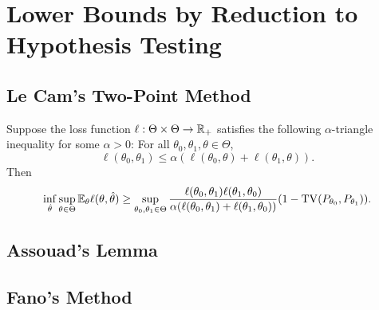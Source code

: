 \section{Lower Bounds by Reduction to Hypothesis Testing}
\subsection{Le Cam's Two-Point Method}
\begin{theorem}
    Suppose the loss function $\ell:\Theta\times\Theta\to\mathbb{R}_{+}$ satisfies the following $\alpha$-triangle inequality for some $\alpha>0$: For all $\theta_0,\theta_1,\theta\in\Theta$,
    \[\ell(\theta_0,\theta_1)\leq \alpha(\ell(\theta_0,\theta)+\ell(\theta_1,\theta)).\]
    Then 
    \begin{equation*}
        \inf_{\hat\theta}\sup_{\theta\in\Theta}\mathbb{E}_\theta\ell(\theta,\hat\theta)\geq \sup_{\theta_0,\theta_1\in\Theta}\frac{\ell(\theta_0,\theta_1)\ell(\theta_1,\theta_0)}{\alpha(\ell(\theta_0,\theta_1)+\ell(\theta_1,\theta_0))}(1-\operatorname{TV}(P_{\theta_0},P_{\theta_1})).
    \end{equation*}
\end{theorem}

\subsection{Assouad's Lemma}


\subsection{Fano's Method}

